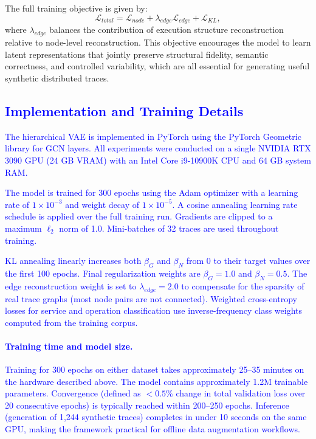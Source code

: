 \documentclass[sigconf,review]{acmart}
\begin{document}
The full training objective is given by:
\begin{equation}
\mathcal{L}_{total} =
\mathcal{L}_{node}
+ \lambda_{edge} \mathcal{L}_{edge}
+ \mathcal{L}_{KL},
\end{equation}
where $\lambda_{edge}$ balances the contribution of execution structure reconstruction relative to node-level reconstruction. This objective encourages the model to learn latent representations that jointly preserve structural fidelity, semantic correctness, and controlled variability, which are all essential for generating useful synthetic distributed traces.

\textcolor{blue}{\subsection{Implementation and Training Details}
\label{sec:impl}

The hierarchical VAE is implemented in PyTorch using the PyTorch Geometric library for GCN layers. All experiments were conducted on a single NVIDIA RTX 3090 GPU (24 GB VRAM) with an Intel Core i9-10900K CPU and 64 GB system RAM.

The model is trained for 300 epochs using the Adam optimizer with a learning rate of $1\times10^{-3}$ and weight decay of $1\times10^{-5}$. A cosine annealing learning rate schedule is applied over the full training run. Gradients are clipped to a maximum $\ell_2$ norm of 1.0. Mini-batches of 32 traces are used throughout training.

KL annealing linearly increases both $\beta_G$ and $\beta_N$ from 0 to their target values over the first 100 epochs. Final regularization weights are $\beta_G = 1.0$ and $\beta_N = 0.5$. The edge reconstruction weight is set to $\lambda_{edge} = 2.0$ to compensate for the sparsity of real trace graphs (most node pairs are not connected). Weighted cross-entropy losses for service and operation classification use inverse-frequency class weights computed from the training corpus.

\paragraph{Training time and model size.}
Training for 300 epochs on either dataset takes approximately 25--35 minutes on the hardware described above. The model contains approximately 1.2M trainable parameters. Convergence (defined as $<0.5\%$ change in total validation loss over 20 consecutive epochs) is typically reached within 200--250 epochs. Inference (generation of 1,244 synthetic traces) completes in under 10 seconds on the same GPU, making the framework practical for offline data augmentation workflows.

}
\end{document}
